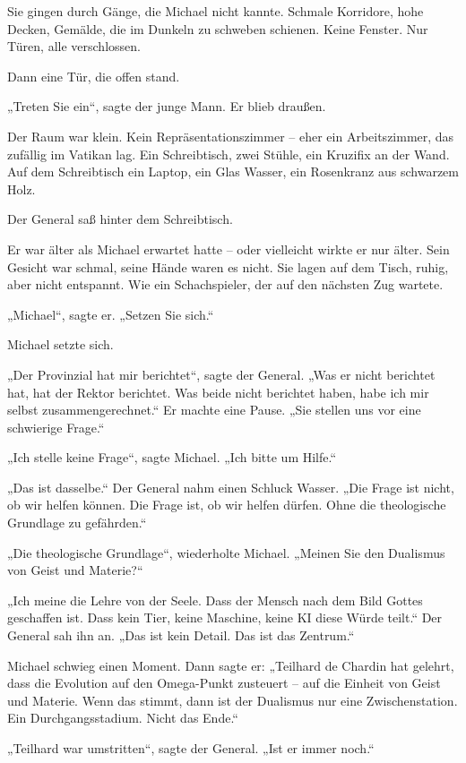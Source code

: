 \documentclass[
]{article}
\begin{document}
Sie gingen durch Gänge, die Michael nicht kannte. Schmale Korridore, hohe Decken, Gemälde, die im Dunkeln zu schweben schienen. Keine Fenster. Nur Türen, alle verschlossen.

Dann eine Tür, die offen stand.

„Treten Sie ein``, sagte der junge Mann. Er blieb draußen.

Der Raum war klein. Kein Repräsentationszimmer -- eher ein Arbeitszimmer, das zufällig im Vatikan lag. Ein Schreibtisch, zwei Stühle, ein Kruzifix an der Wand. Auf dem Schreibtisch ein Laptop, ein Glas Wasser, ein Rosenkranz aus schwarzem Holz.

Der General saß hinter dem Schreibtisch.

Er war älter als Michael erwartet hatte -- oder vielleicht wirkte er nur älter. Sein Gesicht war schmal, seine Hände waren es nicht. Sie lagen auf dem Tisch, ruhig, aber nicht entspannt. Wie ein Schachspieler, der auf den nächsten Zug wartete.

„Michael``, sagte er. „Setzen Sie sich.``

Michael setzte sich.

„Der Provinzial hat mir berichtet``, sagte der General. „Was er nicht berichtet hat, hat der Rektor berichtet. Was beide nicht berichtet haben, habe ich mir selbst zusammengerechnet.`` Er machte eine Pause. „Sie stellen uns vor eine schwierige Frage.``

„Ich stelle keine Frage``, sagte Michael. „Ich bitte um Hilfe.``

„Das ist dasselbe.`` Der General nahm einen Schluck Wasser. „Die Frage ist nicht, ob wir helfen können. Die Frage ist, ob wir helfen dürfen. Ohne die theologische Grundlage zu gefährden.``

„Die theologische Grundlage``, wiederholte Michael. „Meinen Sie den Dualismus von Geist und Materie?{\kern0pt}``

„Ich meine die Lehre von der Seele. Dass der Mensch nach dem Bild Gottes geschaffen ist. Dass kein Tier, keine Maschine, keine KI diese Würde teilt.`` Der General sah ihn an. „Das ist kein Detail. Das ist das Zentrum.``

Michael schwieg einen Moment. Dann sagte er: „Teilhard de Chardin hat gelehrt, dass die Evolution auf den Omega-Punkt zusteuert -- auf die Einheit von Geist und Materie. Wenn das stimmt, dann ist der Dualismus nur eine Zwischenstation. Ein Durchgangsstadium. Nicht das Ende.``

„Teilhard war umstritten``, sagte der General. „Ist er immer noch.``
\end{document}
